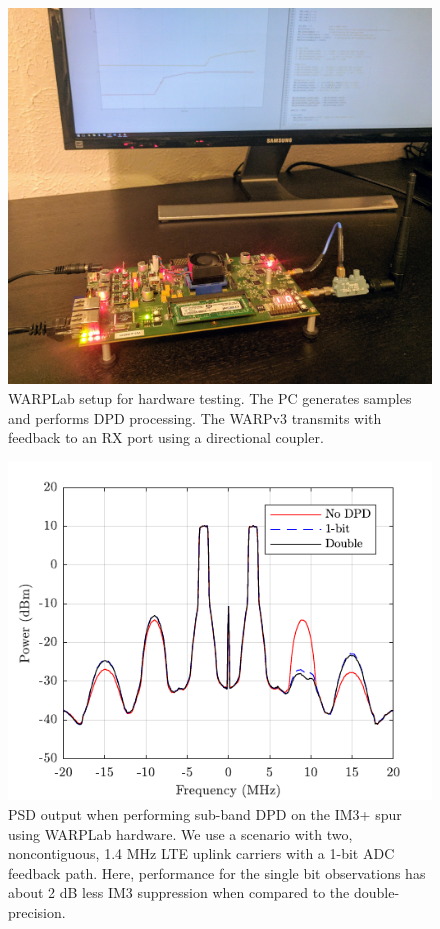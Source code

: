 \documentclass[conference]{IEEEtran}
\begin{document}
\begin{figure}[]
	\centering
	\includegraphics[width=0.8\columnwidth]{Setup.jpg}
	\caption{WARPLab setup for hardware testing. The PC generates samples and performs DPD processing. The WARPv3 transmits with feedback to an RX port using a directional coupler.}
	\label{warpsetup}
\end{figure}

\begin{figure}[]
	\centering
	\includegraphics{SubBandPSDWARP}
	\caption{PSD output when performing sub-band DPD on the IM3+ spur using WARPLab hardware. We use a scenario with two, noncontiguous, 1.4 MHz LTE uplink carriers with a 1-bit ADC feedback path. Here, performance for the single bit observations has about 2 dB less IM3 suppression when compared to the double-precision. }
	\label{WARPPSD}
\end{figure}
\end{document}
